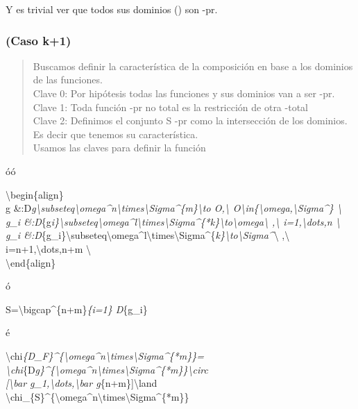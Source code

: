 \documentclass[
]{article}
\begin{document}
Y es trivial ver que todos sus dominios ({}) son {}-pr.

\hypertarget{caso-k1}{%
\subsubsection{(Caso k+1)}\label{caso-k1}}

\begin{quote}
Buscamos definir la característica de la composición en base a los
dominios de las funciones.\\
Clave 0: Por hipótesis todas las funciones y sus dominios van a ser
{}-pr.\\
Clave 1: Toda función {} {}-pr no total es la restricción de otra {}
{}-total\\
Clave 2: Definimos el conjunto S {}-pr como la intersección de los
dominios. Es decir que tenemos su característica.\\
Usamos las claves para definir la función
\end{quote}

óó

\textbackslash begin\{align\}\\
g
\&:D\emph{g\textbackslash subseteq\textbackslash omega\^{}n\textbackslash times\textbackslash Sigma\^{}\{\emph{m\}\textbackslash to
O,\textbackslash{}
O\textbackslash in\{\textbackslash omega,\textbackslash Sigma\^{}}\}
\textbackslash{}\\
g\_i
\&:D}\{g\emph{i\}\textbackslash subseteq\textbackslash omega\^{}l\textbackslash times\textbackslash Sigma\^{}\{*k\}\textbackslash to\textbackslash omega\textbackslash{}
,\textbackslash{} i=1,\textbackslash dots,n \textbackslash{}\\
g\_i
\&:D}\{g\_i\}\textbackslash subseteq\textbackslash omega\^{}l\textbackslash times\textbackslash Sigma\^{}\{\emph{k\}\textbackslash to\textbackslash Sigma\^{}}\textbackslash{}
,\textbackslash{} i=n+1,\textbackslash dots,n+m \textbackslash{}\\
\textbackslash end\{align\}

ó

S=\textbackslash bigcap\^{}\{n+m\}\emph{\{i=1\} D}\{g\_i\}

é

\textbackslash chi\emph{\{D\_F\}\^{}\{\textbackslash omega\^{}n\textbackslash times\textbackslash Sigma\^{}\{*m\}\}=\\
\textbackslash chi}\{D\emph{g\}\^{}\{\textbackslash omega\^{}n\textbackslash times\textbackslash Sigma\^{}\{*m\}\}\textbackslash circ\\
{[}\textbackslash bar g\_1,\textbackslash dots,\textbackslash bar
g}\{n+m\}{]}\textbackslash land\\
\textbackslash chi\_\{S\}\^{}\{\textbackslash omega\^{}n\textbackslash times\textbackslash Sigma\^{}\{*m\}\}
\end{document}
